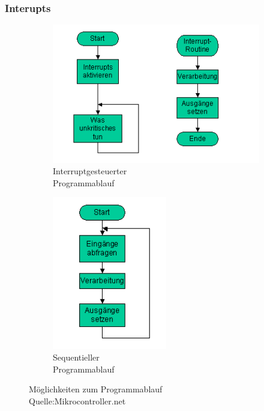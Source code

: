 \documentclass[a4paper, 11pt]{scrartcl}
\begin{document}
		\subsubsection{Interupts}
		\begin{figure}[h]
			\centering
			\begin{subfigure}{0.47\textwidth}
				\centering
				\includegraphics[width=1.1\textwidth]{rec/Interrupt_Programme.png}
				\caption{Interruptgesteuerter \\Programmablauf}
				\label{InterruptgesteuerterProgrammablauf}
			\end{subfigure}
			\begin{subfigure}{0.47\textwidth}
				\centering
				\includegraphics[width=0.55\textwidth]{rec/Sequentielle_Programme.png}
				\caption{Sequentieller \\Programmablauf}
				\label{SequentiellerProgrammablauf}
			\end{subfigure}
			\caption[Möglichkeiten zum Programmablauf]{Möglichkeiten zum Programmablauf
			\\Quelle:Mikrocontroller.net}
			\label{Programmablauf}
		\end{figure}
\end{document}
